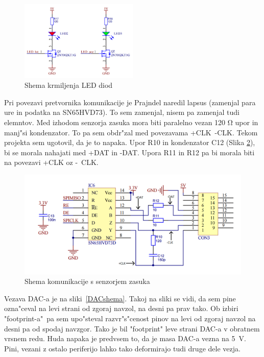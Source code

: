 \documentclass[a4paper]{article}
\begin{document}
	\begin{figure}[h!]
		\centering
		\includegraphics[width=0.5\textwidth ]{LED.png}
		\caption{Shema krmiljenja LED diod}
		 \label{fig:LEDshema}
	\end{figure}
Pri povezavi pretvornika komunikacije je Prajndel naredil lapsus (zamenjal para ure in podatka na SN65HVD73). To sem zamenjal, nisem pa zamenjal tudi elemntov. Med izhodom senzorja zasuka mora biti paralelno vezan 120 $\mathrm{\Omega}$ upor in manj"si kondenzator. To pa sem obdr"zal med povezavama +CLK~-CLK. Tekom projekta sem ugotovil, da je to napaka. Upor R10 in kondenzator C12 (Slika \ref{SPIshema}), bi se morala nahajati med +DAT in -DAT. Upora R11 in R12 pa bi morala biti na povezavi +CLK oz -~CLK.

	\begin{figure}[h!]
		\centering
		\includegraphics[width=\textwidth]{SPI_interface.png}
		\caption{Shema komunikacije s senzorjem zasuka}
		\label{SPIshema}
	\end{figure}
Vezava DAC-a je na sliki~\ref{DACshema}. Takoj na sliki se vidi, da sem pine ozna"ceval na levi strani od zgoraj navzol, na desni pa prav tako. Ob izbiri
"\mbox{footprint-a}"~pa sem upo"steval razvr"s"cenost pinov na levi od zgoraj navzol na desni pa od spodaj navzgor. Tako je bil "footprint" leve strani DAC-a v obratnem vrsnem redu. Huda napaka je predvsem to, da je masa DAC-a vezna na 5~V. Pini, vezani z ostalo periferijo lahko tako deformirajo tudi druge dele vezja.
\end{document}
